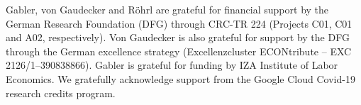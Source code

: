 Gabler, von Gaudecker and Röhrl are grateful for financial support by the German Research
Foundation (DFG) through CRC-TR 224 (Projects C01, C01 and A02, respectively). Von
Gaudecker is also grateful for support by the DFG through the German excellence strategy
(Excellenzcluster ECONtribute – EXC 2126/1–390838866). Gabler is grateful for funding by
IZA Institute of Labor Economics. We gratefully acknowledge support from the Google Cloud
Covid-19 research credits program.
